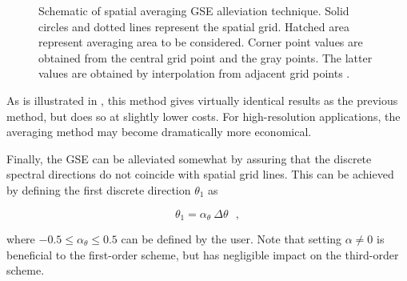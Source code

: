 \begin{figure} \begin{center}
\caption{Schematic of spatial averaging GSE alleviation technique. 
Solid circles and dotted lines represent the spatial grid. Hatched
area represent averaging area to be considered. Corner point values are
obtained from the central grid point and the gray points. The latter values
are obtained by interpolation from adjacent grid points
\citep[from][]{tol:OMOD02b}.}
\label{fig:GSE_1} \botline
\end{center}
\end{figure}

As is illustrated in \cite{tol:OMOD02b,tol:OMB02b}, this method gives
virtually identical results as the previous method, but does so at slightly
lower costs. For high-resolution applications, the averaging method may become
dramatically more economical.



Finally, the GSE can be alleviated somewhat by assuring that the discrete
spectral directions do not coincide with spatial grid lines. This can be
achieved by defining the first discrete direction $\theta_1$ as


\begin{equation}
\theta_1 = \alpha_\theta \: \Delta \theta \:\:\: , \label{eq:theta1}
\end{equation}

\noindent
where $-0.5 \leq \alpha_\theta \leq 0.5$ can be defined by the user. Note that
setting $\alpha \neq 0$ is beneficial to the first-order scheme, but has
negligible impact on the third-order scheme.
 
